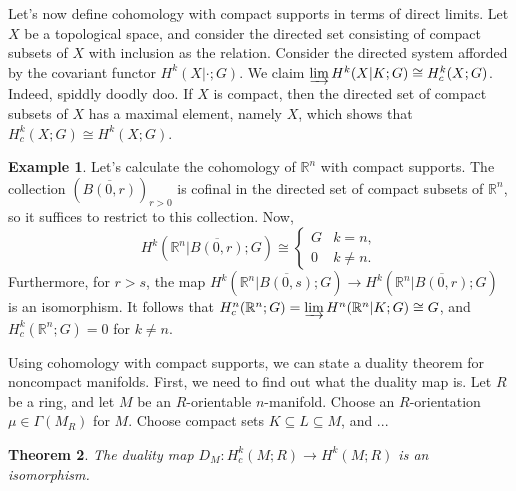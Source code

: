 \documentclass{book}
\newcommand{\bbR}{\mathbb{R}}
\newtheorem{theorem}{Theorem}[section]
\theoremstyle{definition}
\newtheorem{example}[theorem]{Example}
\theoremstyle{remark}
\numberwithin{equation}{section}
\begin{document}
Let's now define cohomology with compact supports in terms of direct limits. Let $X$ be a topological space, and consider the directed set consisting of compact subsets of $X$ with inclusion as the relation. Consider the directed system afforded by the covariant functor $H^k(X \vert \cdot;G)$. We claim $\varinjlim H^k(X \vert K ; G) \cong H^k_c(X ; G)$. Indeed, spiddly doodly doo. If $X$ is compact, then the directed set of compact subsets of $X$ has a maximal element, namely $X$, which shows that $H_c^k(X;G) \cong H^k(X;G)$.

\begin{example}
    Let's calculate the cohomology of $\bbR^n$ with compact supports. The collection $(\overline{B(0,r)})_{r > 0}$ is cofinal in the directed set of compact subsets of $\bbR^n$, so it suffices to restrict to this collection. Now,
    \begin{equation}
        H^k(\bbR^n \vert \overline{B(0,r)} ; G) \cong
        \begin{cases}
            G & k = n, \\
            0    & k \neq n.
        \end{cases}
    \end{equation}
    Furthermore, for $r > s$, the map $H^k(\bbR^n \vert \overline{B(0,s)} ; G) \to H^k(\bbR^n \vert \overline{B(0,r)} ; G)$ is an isomorphism. It follows that $H_c^n(\bbR^n ; G) = \varinjlim H^n(\bbR^n \vert K ; G) \cong G$, and $H_c^k(\bbR^n ; G) = 0$ for $k \neq n$.
\end{example}

Using cohomology with compact supports, we can state a duality theorem for noncompact manifolds. First, we need to find out what the duality map is. Let $R$ be a ring, and let $M$ be an $R$-orientable $n$-manifold. Choose an $R$-orientation $\mu \in \Gamma(M_R)$ for $M$. Choose compact sets $K \subseteq L \subseteq M$, and ... 

\begin{theorem}
    The duality map $D_M \colon H^k_c(M;R) \to H^k(M;R)$ is an isomorphism.
\end{theorem}
\end{document}
